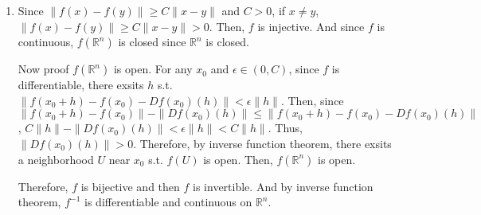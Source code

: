 \documentclass[12pt]{article}
\begin{document}
\begin{enumerate}
    \item Since $\|f(x) - f(y) \| \geq C\| x-y \|$ and $C > 0$, if $x \neq y$, $\| f(x) - f(y) \| \geq C\|x - y\| > 0$.
    Then, $f$ is injective.
    And since $f$ is continuous, $f(\mathbb{R}^n)$ is closed since $\mathbb{R}^n$ is closed.

    Now proof $f(\mathbb{R}^n)$ is open.
    For any $x_0$ and $\epsilon \in (0, C)$, since $f$ is differentiable, there exsits $h$ s.t. 
    $\| f(x_0+h) - f(x_0) - Df(x_0)(h)\| < \epsilon \| h\|$.
    Then, since $\| f(x_0+h) - f(x_0)\| - \|Df(x_0)(h)\| \leq \| f(x_0+h) - f(x_0) - Df(x_0)(h)\|$,
    $C\| h\| - \|Df(x_0)(h)\| < \epsilon\|h\| < C\| h \|$.
    Thus, $\| Df(x_0)(h)\| > 0$.
    Therefore, by inverse function theorem, there exsits a neighborhood $U$ near $x_0$ s.t. $f(U)$ is open.
    Then, $f(\mathbb{R}^n)$ is open.

    Therefore, $f$ is bijective and then $f$ is invertible.
    And by inverse function theorem, $f^{-1}$ is differentiable and continuous on $\mathbb{R}^n$.
    
\end{enumerate}
\end{document}
